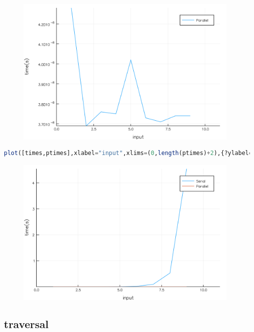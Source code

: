 \documentclass[a4paper,12pt]{article}
\begin{document}
\begin{figure}[ht!]
\centering
\includegraphics[width=11cm,scale=0.3]{boxParallel.png}
\end{figure}
\begin{lstlisting}[language=Julia,format=Julia]
plot([times,ptimes],xlabel="input",xlims=(0,length(ptimes)+2),{?ylabel="time(s)",label=["Serial","Parallel"])
\end{lstlisting}
\begin{figure}[ht!]
\centering
\includegraphics[width=11cm,scale=0.3]{boxC.png}
\end{figure}
\newpage
\subsection{traversal}
\end{document}
